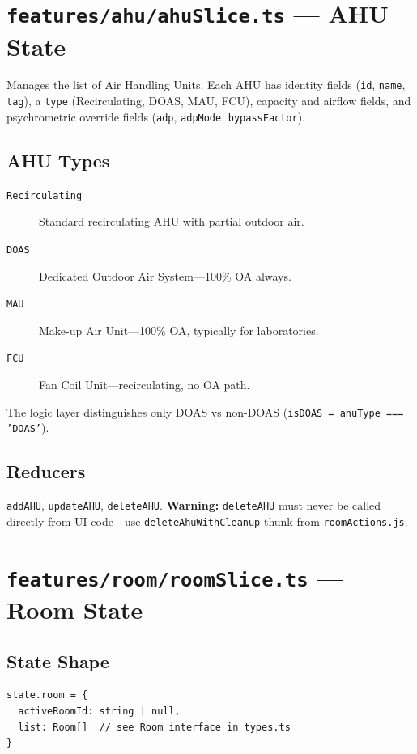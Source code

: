 \documentclass[12pt, a4paper, oneside]{report}
\newcommand{\file}[1]{\texttt{\textcolor{codeblue}{#1}}}
\newcommand{\code}[1]{\texttt{\textcolor{codered}{#1}}}
\newcommand{\warn}[1]{\textcolor{warnorange}{\textbf{Warning:}} #1}
\begin{document}
\section{\file{features/ahu/ahuSlice.ts} --- AHU State}

Manages the list of Air Handling Units. Each AHU has identity fields (\code{id}, \code{name}, \code{tag}), a \code{type} (Recirculating, DOAS, MAU, FCU), capacity and airflow fields, and psychrometric override fields (\code{adp}, \code{adpMode}, \code{bypassFactor}).

\subsection{AHU Types}
\begin{description}
  \item[\code{Recirculating}] Standard recirculating AHU with partial outdoor air.
  \item[\code{DOAS}] Dedicated Outdoor Air System---100\% OA always.
  \item[\code{MAU}] Make-up Air Unit---100\% OA, typically for laboratories.
  \item[\code{FCU}] Fan Coil Unit---recirculating, no OA path.
\end{description}

The logic layer distinguishes only DOAS vs non-DOAS (\code{isDOAS = ahuType === 'DOAS'}).

\subsection{Reducers}
\code{addAHU}, \code{updateAHU}, \code{deleteAHU}. \warn{\code{deleteAHU} must never be called directly from UI code---use \code{deleteAhuWithCleanup} thunk from \file{roomActions.js}.}

\section{\file{features/room/roomSlice.ts} --- Room State}

\subsection{State Shape}
\begin{lstlisting}[language={}, caption={Room State Shape}]
state.room = {
  activeRoomId: string | null,
  list: Room[]  // see Room interface in types.ts
}
\end{lstlisting}
\end{document}
